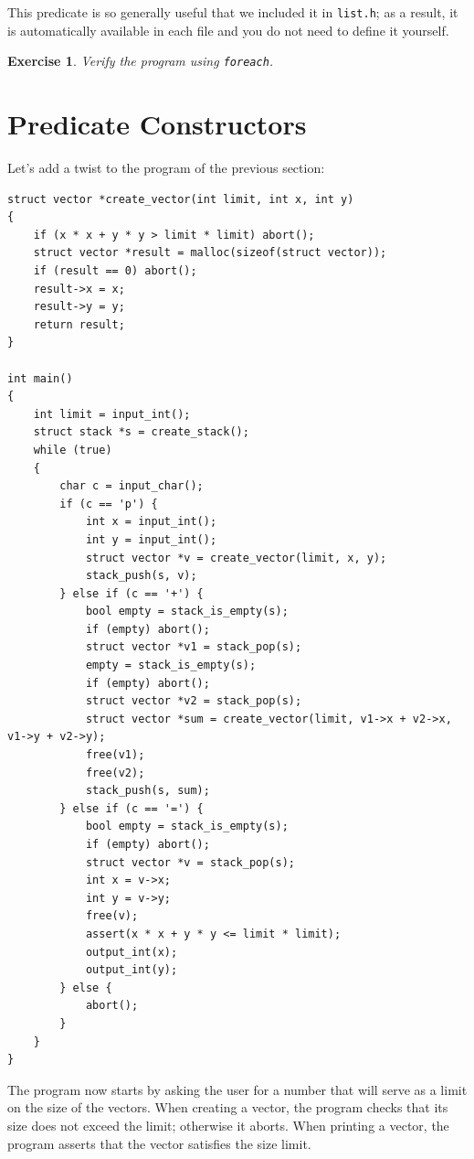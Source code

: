 \documentclass{article}
\newtheorem{exercise}{Exercise}
\begin{document}
This predicate is so generally useful that we included it in
\texttt{list.h}; as a result, it is automatically available in
each file and you do not need to define it yourself.

\begin{exercise}\label{exercise:foreach}
Verify the program using \lstinline!foreach!.
\end{exercise}

\section{Predicate Constructors}\label{section:predctors}

Let's add a twist to the program of the previous section:
\begin{lstlisting}
struct vector *create_vector(int limit, int x, int y)
{
    if (x * x + y * y > limit * limit) abort();
    struct vector *result = malloc(sizeof(struct vector));
    if (result == 0) abort();
    result->x = x;
    result->y = y;
    return result;
}

int main()
{
    int limit = input_int();
    struct stack *s = create_stack();
    while (true)
    {
        char c = input_char();
        if (c == 'p') {
            int x = input_int();
            int y = input_int();
            struct vector *v = create_vector(limit, x, y);
            stack_push(s, v);
        } else if (c == '+') {
            bool empty = stack_is_empty(s);
            if (empty) abort();
            struct vector *v1 = stack_pop(s);
            empty = stack_is_empty(s);
            if (empty) abort();
            struct vector *v2 = stack_pop(s);
            struct vector *sum = create_vector(limit, v1->x + v2->x, v1->y + v2->y);
            free(v1);
            free(v2);
            stack_push(s, sum);
        } else if (c == '=') {
            bool empty = stack_is_empty(s);
            if (empty) abort();
            struct vector *v = stack_pop(s);
            int x = v->x;
            int y = v->y;
            free(v);
            assert(x * x + y * y <= limit * limit);
            output_int(x);
            output_int(y);
        } else {
            abort();
        }
    }
}
\end{lstlisting}
The program now starts by asking the user for a number that
will serve as a limit on the size of the vectors. When creating
a vector, the program checks that its size does not exceed the
limit; otherwise it aborts. When printing a vector, the program
asserts that the vector satisfies the size limit.
\end{document}
